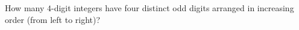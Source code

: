 How many $4$-digit integers have four distinct odd digits arranged in increasing order (from left to right)?

